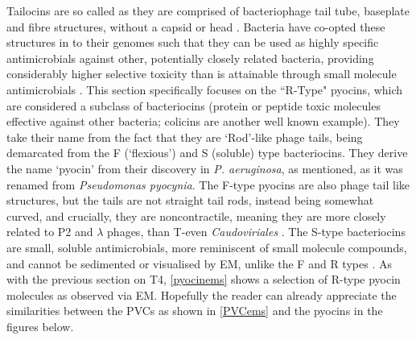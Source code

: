Tailocins are so called as they are comprised of bacteriophage tail tube, baseplate and fibre structures, without a capsid or head \citep{Ishii1965}. Bacteria have co-opted these structures in to their genomes such that they can be used as highly specific antimicrobials against other, potentially closely related bacteria, providing considerably higher selective toxicity than is attainable through small molecule antimicrobials \citep{Heo2007}. This section specifically focuses on the ``R-Type" pyocins, which are considered a subclass of bacteriocins (protein or peptide toxic molecules effective against other bacteria; colicins are another well known example). They take their name from the fact that they are `Rod'-like phage tails, being demarcated from the F (`flexious') and S (soluble) type bacteriocins. They derive the name `pyocin' from their discovery in \emph{P. aeruginosa}, as mentioned, as it was renamed from \emph{Pseudomonas pyocynia}. The F-type pyocins are also phage tail like structures, but the tails are not straight tail rods, instead being somewhat curved, and crucially, they are noncontractile, meaning they are more closely related to P2 and $\lambda$ phages, than T-even \emph{Caudoviriales} \citep{Michel-Briand2002,Nakayama2000}. The S-type bacteriocins are small, soluble antimicrobials, more reminiscent of small molecule compounds, and cannot be sedimented or visualised by EM, unlike the F and R types \citep{Heo2007, kageyama1975bacteriocins}. As with the previous section on T4, \vref{pyocinems} shows a selection of R-type pyocin molecules as observed via EM. Hopefully the reader can already appreciate the similarities between the PVCs as shown in \vref{PVCems} and the pyocins in the figures below.


